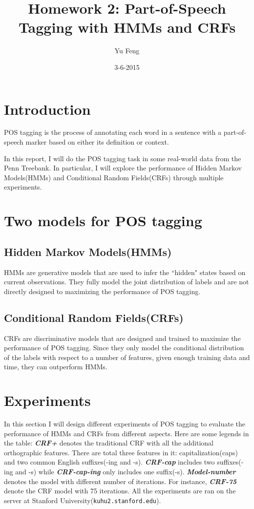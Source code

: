 \documentclass[10pt]{article}
\title{Homework 2: Part-of-Speech Tagging with HMMs and CRFs}
\author{Yu Feng}
\date{3-6-2015}
\begin{document}
\maketitle

\section{Introduction}
POS tagging is the process of annotating each word in a sentence with a part-of-speech marker based on either its definition or context.

In this report, I will do the POS tagging task in some real-world data from the Penn Treebank. In particular, I will explore the performance of Hidden Markov Models(HMMs) and Conditional Random Fields(CRFs) through multiple experiments.
 
\section{Two models for POS tagging}\label{sec:alg}

\subsection{Hidden Markov Models(HMMs)}
HMMs are generative models that are used to infer the ``hidden" states based on current observations. They fully model the joint distribution of labels and are not directly designed to maximizing the performance of POS tagging.


\subsection{Conditional Random Fields(CRFs)}
CRFs are discriminative models that are designed and trained to maximize the performance of POS tagging. Since they only model the conditional distribution of the labels with respect to a number of features, given enough training data and time, they can outperform HMMs. 

\section{Experiments}\label{sec:exp}
In this section I will design different experiments of POS tagging to evaluate the performance of HMMs and CRFs from different aspects. Here are some legends in the table:
{\bf \emph{CRF+}} denotes the traditional CRF with all the additional orthographic features. There are total three features in it: capitalization(caps) and two common English suffixes(-ing and -s). {\bf \emph{CRF-cap}} includes two suffixes(-ing and -s) while {\bf \emph{CRF-cap-ing}} only includes one suffix(-s).  {\bf \emph{Model-number}} denotes the model with different number of iterations. For instance, {\bf \emph{CRF-75}} denote the CRF model with 75 iterations. All the experiments are ran on the server at Stanford University(\texttt{kuhu2.stanford.edu}).
\end{document}
